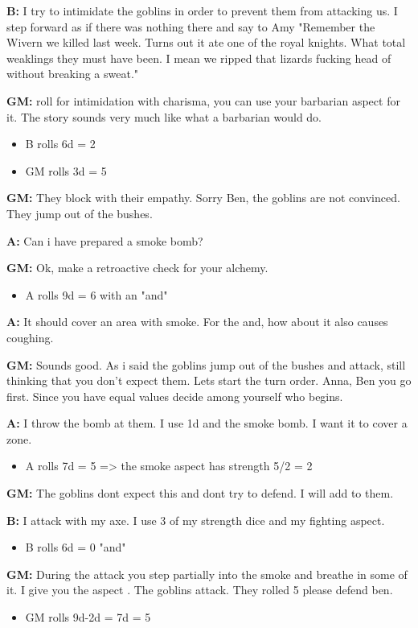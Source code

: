 \documentclass[11pt]{article}
\begin{document}
{\textbf{B:} I try to intimidate the goblins in order to prevent them from attacking us. I step forward as if there was nothing there and say to Amy "Remember the Wivern we killed last week. Turns out it ate one of the royal knights. What total weaklings they must have been. I mean we ripped that lizards fucking head of without breaking a sweat."

\textbf{GM:} roll for intimidation with charisma, you can use your barbarian aspect for it. The story sounds very much like what a barbarian would do.
\begin{itemize}
\item B rolls 6d = 2
\item GM rolls 3d = 5
\end{itemize}

\textbf{GM:} They block with their empathy. Sorry Ben, the goblins are not convinced. They jump out of the bushes.

\textbf{A:} Can i have prepared a smoke bomb?

\textbf{GM:} Ok, make a retroactive check for your alchemy.
\begin{itemize}
\item A rolls 9d = 6 with an "and"
\end{itemize}

\textbf{A:} It should cover an area with smoke. For the and, how about it also causes coughing.

\textbf{GM:} Sounds good. As i said the goblins jump out of the bushes and attack, still thinking that you don't expect them. Lets start the turn order. Anna, Ben you go first. Since you have equal values decide among yourself who begins.

\textbf{A:} I throw the bomb at them. I use 1d and the smoke bomb. I want it to cover a zone.
\begin{itemize}
\item A rolls 7d = 5 => the smoke aspect has strength 5/2 = 2
\end{itemize}

\textbf{GM:} The goblins dont expect this and dont try to defend. I will add  to them.

\textbf{B:} I attack with my axe. I use 3 of my strength dice and my fighting aspect.
\begin{itemize}
\item B rolls 6d = 0 "and"
\end{itemize}

\textbf{GM:} During the attack you step partially into the smoke and breathe in some of it. I give you the aspect . The goblins attack. They rolled 5 please defend ben.
\begin{itemize}
\item GM rolls 9d-2d = 7d = 5
\end{itemize}

}
\end{document}
